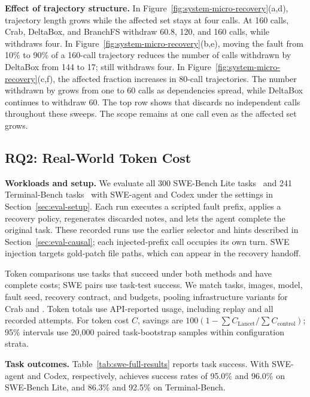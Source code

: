 \textbf{Effect of trajectory structure.}
In Figure~\ref{fig:system-micro-recovery}(a,d), trajectory length grows
while the affected set stays at four calls. At 160 calls, Crab,
DeltaBox, and BranchFS withdraw 60.8, 120, and 160 calls,
while \system withdraws four. In Figure~\ref{fig:system-micro-recovery}(b,e),
moving the fault from 10\% to 90\% of a 160-call trajectory reduces
the number of calls withdrawn by DeltaBox from 144 to 17; \system still
withdraws four. In Figure~\ref{fig:system-micro-recovery}(c,f), the
affected fraction increases in 80-call trajectories. The number withdrawn by \system grows
from one to 60 calls as dependencies spread, while DeltaBox
continues to withdraw 60. The top row shows that \system discards no
independent calls throughout these sweeps. The \trycmd scope remains at one
call even as the affected set grows.

\subsection{RQ2: Real-World Token Cost}
\label{sec:eval-agent}

\textbf{Workloads and setup.}
We evaluate all 300 SWE-Bench Lite tasks~\cite{swebench} and 241
Terminal-Bench tasks~\cite{tbench} with SWE-agent and Codex under the settings
in Section~\ref{sec:eval-setup}. Each run executes a scripted fault prefix,
applies a recovery policy,
regenerates discarded notes, and lets the agent complete the original task.
These recorded runs use the earlier selector and hints described in
Section~\ref{sec:eval-causal}; each injected-prefix call occupies its own
turn. SWE injection targets gold-patch file paths, which can appear in the
recovery handoff.

Token comparisons use tasks that succeed
under both methods and have complete costs; SWE \trycmd pairs use task-test
success. We match tasks, images, model,
fault seed, recovery contract, and budgets, pooling infrastructure variants
for Crab and \trycmd. Token totals use API-reported usage, including replay and all
recorded attempts. For token cost $C$, savings are
$100(1-\sum C_{\mathrm{Lancet}}/\sum C_{\mathrm{control}})$; 95\%
intervals use 20,000 paired task-bootstrap samples within configuration
strata.



\textbf{Task outcomes.}
Table~\ref{tab:swe-full-results} reports task success. With SWE-agent and
Codex, respectively, \system achieves success rates of 95.0\% and 96.0\% on
SWE-Bench Lite, and 86.3\% and 92.5\% on Terminal-Bench.

